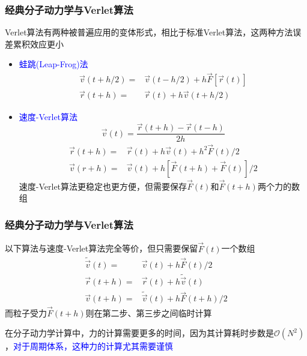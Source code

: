 \frame
{
	\frametitle{经典分子动力学与\textrm{Verlet}算法}
	\textrm{Verlet}算法有两种被普遍应用的变体形式，相比于标准\textrm{Verlet}算法，这两种方法误差累积效应更小
	\begin{itemize}
		\item \textcolor{blue}{蛙跳(\textrm{Leap-Frog})法}
			\begin{displaymath}
				\begin{aligned}
					\vec v(t+h/2)=&\vec v(t-h/2)+h\vec F[\vec r(t)]\\
					\vec r(t+h)=&\vec r(t)+h\vec v(t+h/2)
				\end{aligned}
			\end{displaymath}
		\item \textcolor{blue}{速度-\textrm{Verlet}算法}
			\begin{displaymath}
				\vec v(t)=\dfrac{\vec r(t+h)-\vec r(t-h)}{2h}
			\end{displaymath}
			\begin{displaymath}
				\begin{aligned}
					\vec r(t+h)=&\vec r(t)+h\vec v(t)+h^2\vec F(t)/2\\
					\vec v(r+h)=&\vec v(t)+h[\vec F(t+h)+\vec F(t)]/2
				\end{aligned}
			\end{displaymath}
			速度-\textrm{Verlet}算法更稳定也更方便，但需要保存$\vec F(t)$和$\vec F(t+h)$两个力的数组
	\end{itemize}
}

\frame
{
	\frametitle{经典分子动力学与\textrm{Verlet}算法}
	以下算法与速度-\textrm{Verlet}算法完全等价，但只需要保留$\vec F(t)$一个数组
	\begin{displaymath}
		\begin{aligned}
			\tilde{\vec v}(t)=&\vec v(t)+h\vec F(t)/2\\
			\vec r(t+h)=&\vec r(t)+h\tilde{\vec v}(t)\\
			\vec v(t+h)=&\tilde{\vec v}(t)+h\vec F(t+h)/2
		\end{aligned}
	\end{displaymath}
	而粒子受力$\vec F(t+h)$则在第二步、第三步之间临时计算
\vskip 5pt
	{\fontsize{6.2pt}{4.2pt}}

	在分子动力学计算中，力的计算需要更多的时间，因为其计算耗时步数是$\mathscr{O}(N^2)$，\textcolor{blue}{对于周期体系，这种力的计算尤其需要谨慎}
}

